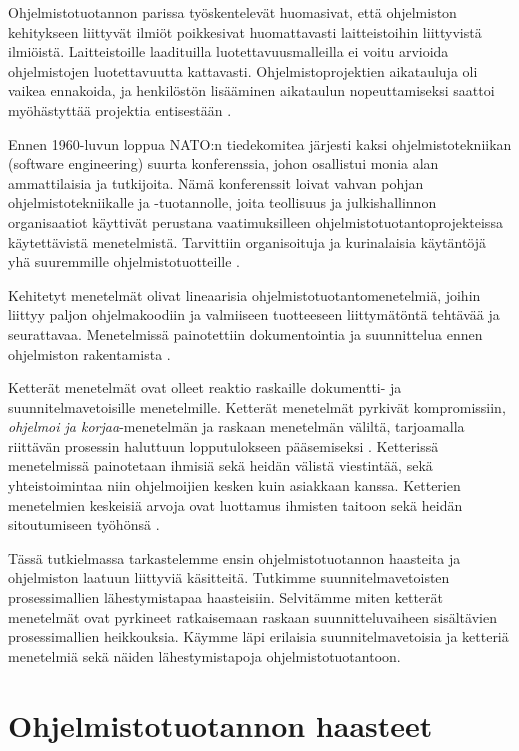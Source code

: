 \documentclass[finnish]{tktltiki2}
\theoremstyle{definition}
\theoremstyle{remark}
\begin{document}
Ohjelmistotuotannon parissa työskentelevät huomasivat, että ohjelmiston kehitykseen liittyvät ilmiöt poikkesivat huomattavasti laitteistoihin liittyvistä ilmiöistä. Laitteistoille laadituilla luotettavuusmalleilla ei voitu arvioida ohjelmistojen luotettavuutta kattavasti. Ohjelmistoprojektien aikatauluja oli vaikea ennakoida, ja henkilöstön lisääminen aikataulun nopeuttamiseksi saattoi myöhästyttää projektia entisestään \cite{BOE06}.

Ennen 1960-luvun loppua NATO:n tiedekomitea järjesti kaksi ohjelmistotekniikan (software engineering) suurta konferenssia, johon osallistui monia alan ammattilaisia ja tutkijoita. Nämä konferenssit loivat vahvan pohjan ohjelmistotekniikalle ja -tuotannolle, joita teollisuus ja julkishallinnon organisaatiot käyttivät perustana vaatimuksilleen ohjelmistotuotantoprojekteissa käytettävistä menetelmistä. Tarvit\-tiin organisoituja ja kurinalaisia käytäntöjä yhä suuremmille ohjelmistotuotteille \cite{BOE06}.

Kehitetyt menetelmät olivat lineaarisia ohjelmistotuotantomenetelmiä, joihin liittyy paljon ohjelmakoodiin ja valmiiseen tuotteeseen liittymätöntä tehtävää ja seurattavaa. Menetelmissä painotettiin dokumentointia ja suunnittelua ennen ohjelmiston rakentamista \cite{FOW01a}.

Ketterät menetelmät ovat olleet reaktio raskaille dokumentti- ja suunnitelmavetoisille menetelmille. Ketterät menetelmät pyrkivät kompromissiin, \textit{ohjelmoi ja korjaa}-menetelmän ja raskaan menetelmän väliltä, tarjoamalla riittävän prosessin haluttuun lopputulokseen pääsemiseksi \cite{FOW01a}. Ketterissä menetelmissä painotetaan ihmisiä sekä heidän välistä viestintää, sekä yhteistoimintaa niin ohjelmoijien kesken kuin asiakkaan kanssa. Ketterien menetelmien keskeisiä arvoja ovat luottamus ihmisten taitoon sekä heidän sitoutumiseen työhönsä \cite{COH01}.

Tässä tutkielmassa tarkastelemme ensin ohjelmistotuotannon haasteita ja ohjelmiston laatuun liittyviä käsitteitä. Tutkimme suunnitelmavetoisten prosessimallien lähestymistapaa haasteisiin. Selvitämme miten ketterät menetelmät ovat pyrkineet ratkaisemaan raskaan suunnitteluvaiheen sisältävien prosessimallien  heikkouksia. Käymme läpi erilaisia suunnitelmavetoisia ja ketteriä menetelmiä sekä näiden lähestymistapoja ohjelmistotuotantoon.

\section{Ohjelmistotuotannon haasteet}
\end{document}
